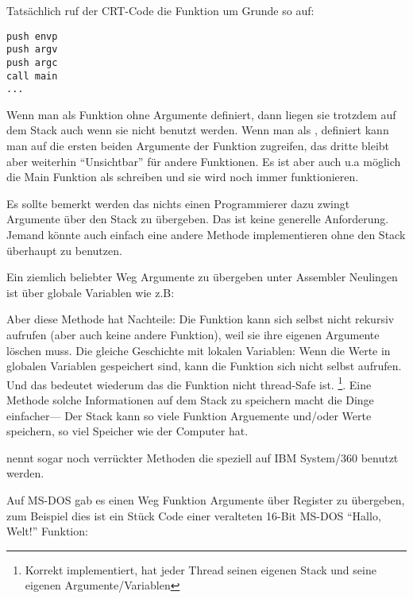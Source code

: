 Tatsächlich ruf der \ac{CRT}-Code die \main Funktion um Grunde so auf:
	
\begin{lstlisting}[style=customasmx86]
push envp
push argv
push argc
call main
...
\end{lstlisting}

Wenn man \main als \main Funktion ohne Argumente definiert, dann liegen sie trotzdem auf dem Stack auch wenn sie 
nicht benutzt werden. Wenn man \main als , definiert kann man auf die ersten beiden
Argumente der Funktion zugreifen, das dritte bleibt aber weiterhin ``Unsichtbar'' für andere Funktionen.
Es ist aber auch u.a möglich die Main Funktion als  schreiben und sie wird noch immer funktionieren.


Es sollte bemerkt werden das nichts einen Programmierer dazu zwingt Argumente über den Stack zu übergeben. Das ist
keine generelle Anforderung. Jemand könnte auch einfach eine andere Methode implementieren ohne den Stack überhaupt zu benutzen.

Ein ziemlich beliebter Weg Argumente zu übergeben unter Assembler Neulingen ist über globale Variablen wie z.B:



Aber diese Methode hat Nachteile: Die  Funktion kann sich selbst nicht rekursiv aufrufen (aber auch keine andere Funktion),
weil sie ihre eigenen Argumente löschen muss.
Die gleiche Geschichte mit lokalen Variablen: Wenn die Werte in globalen Variablen gespeichert sind, kann die Funktion sich nicht selbst aufrufen.
Und das bedeutet wiederum das die Funktion nicht thread-Safe ist.
\footnote{Korrekt implementiert, hat jeder Thread seinen eigenen Stack und seine eigenen Argumente/Variablen}.
Eine Methode solche Informationen auf dem Stack zu speichern macht die Dinge einfacher--- Der Stack kann so viele Funktion Arguemente und/oder Werte speichern,
so viel Speicher wie der Computer hat.

 nennt sogar noch verrückter Methoden die speziell auf IBM System/360 benutzt werden.


Auf MS-DOS gab es einen Weg Funktion Argumente über Register zu übergeben, zum Beispiel dies 
ist ein Stück Code einer veralteten 16-Bit MS-DOS ``Hallo, Welt!'' Funktion:

